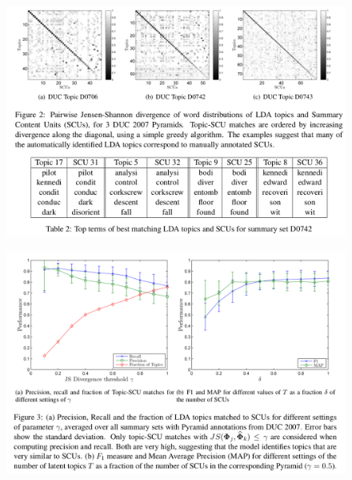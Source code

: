 \documentclass[xcolor={table}]{beamer}
\begin{document}
\begin{frame}[t]{\cite{hennig2010learning}}
      \begin{figure}[h]
          \centering
      \includegraphics[scale=.25]{images/figtab-hennig10.png} \\
  \end{figure}
\end{frame}
\begin{frame}[t]{\cite{hennig2010learning}}
      \begin{figure}[h]
          \centering
      \includegraphics[scale=.25]{images/figure3-hennig10.png} \\
  \end{figure}
\end{frame}
\end{document}
